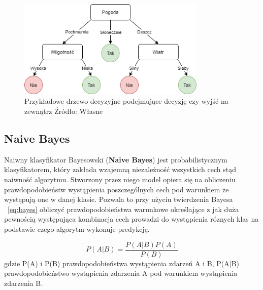 \begin{figure}[h]
    \centering
    \includegraphics[width=0.8\textwidth]{./Img/BinaryTree.png}
    \caption{Przykładowe drzewo decyzyjne podejmujące decyzję czy wyjść na zewnątrz Źródło: Własne}
\end{figure}


\subsection{Naive Bayes}

Naiwny klasyfikator Bayesowski (\textbf{Naive Bayes}) jest probabilistycznym klasyfikatorem, który
zakłada wzajemną niezależność wszystkich cech stąd naiwność algorytmu. Stworzony przez niego model
opiera się na obliczeniu prawdopodobieństw wystąpienia poszczególnych cech pod warunkiem że 
występują one w danej klasie. Pozwala to przy użyciu twierdzenia Bayesa ~\ref{eq:bayes} obliczyć prawdopodobieństwa 
warunkowe określające z jak duża pewnością występująca kombinacja cech prowadzi do 
wystąpienia róznych klas na podstawie czego algorytm wykonuje predykcję. 


\begin{equation}
    \label{eq:bayes}
    P(A|B) = \frac{P(A|B)P(A)}{P(B)}
\end{equation}
gdzie P(A) i P(B) prawdopodobieństwa wystąpienia zdarzeń A i B, P(A|B) prawdopodobieństwo wystąpienia
zdarzenia A pod warunkiem wystąpienia zdarzenia B.

